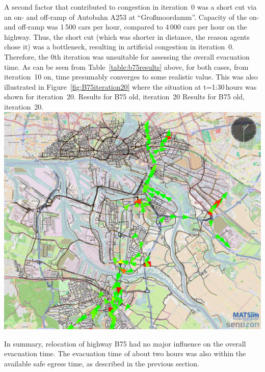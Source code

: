 {}
%
A second factor that contributed to congestion in iteration~0 was a short cut via an on- and off-ramp of Autobahn A253 at ``Gro{\ss}moordamm''. Capacity of the on- and off-ramp was 1\,500 cars per hour, compared to 4\,000 cars per hour on the highway. Thus, the short cut (which was shorter in distance, the reason agents chose it) was a bottleneck, resulting in artificial congestion in iteration~0.
Therefore, the 0th iteration was unsuitable for assessing the overall evacuation time. As can be seen from Table~\ref{table:b75results} above, for both cases, from iteration~10 on, time presumably converges to some realistic value. This was also illustrated in Figure~\ref{fig:B75iteration20} where the situation at t=1:30\,hours was shown for iteration~20.
%
\createfigure%
{Results for B75 old, iteration~20}%
{Results for B75 old, iteration~20.}%
{\label{fig:B75iteration20}}%
{\includegraphics[width=0.7\linewidth]{using/figures/B75iteration20}}%
{}

In summary, relocation of highway B75 had no major influence on the overall evacuation time. The evacuation time of about two hours was also within the available safe egress time, as described in the previous section. 

